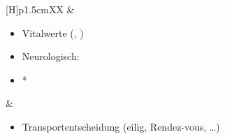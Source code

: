 {\begin{minipage}[t]{\linewidth -
{2\fboxrule} - {2\fboxsep}}
\begin{minipage}[t]{\linewidth}
{\begin{tabularx}{\linewidth}[H]{p{1.5cm}XX}
&
\begin{minipage}[t]{\linewidth}
\begin{itemize}
  \item Vitalwerte (, )
  \item Neurologisch:
  \item *
\end{itemize}
\end{minipage}
&
\noindent\color{Indigo}\begin{minipage}[t]{\linewidth}
\begin{itemize}
  \item Transportentscheidung (eilig, Rendez-vous, \ldots)
\end{itemize}
\end{minipage}
\\\addlinespace\midrule\addlinespace
\noindent{}


\end{tabularx}}
\end{minipage}
\end{minipage}}
